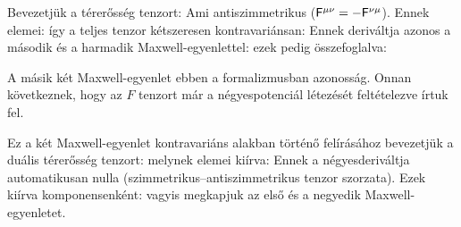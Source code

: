    Bevezetjük a térerősség tenzort:
   Ami antiszimmetrikus ($\mathsf{F}^{\mu\nu}=-\mathsf{F}^{\nu\mu}$). Ennek elemei:
   így a teljes tenzor kétszeresen kontravariánsan:
   Ennek deriváltja azonos a második és a harmadik Maxwell-egyenlettel:
   ezek pedig összefoglalva:
   
   A másik két Maxwell-egyenlet ebben a formalizmusban azonosság. Onnan következnek, hogy az $F$ tenzort már a négyespotenciál létezését feltételezve írtuk fel. 
   
   Ez a két Maxwell-egyenlet kontravariáns alakban történő felírásához bevezetjük a duális térerősség tenzort:
   melynek elemei kiírva:
   Ennek a négyesderiváltja automatikusan nulla (szimmetrikus--antiszimmetrikus tenzor szorzata). Ezek kiírva komponensenként:
   vagyis megkapjuk az első és a negyedik Maxwell-egyenletet. 
   
